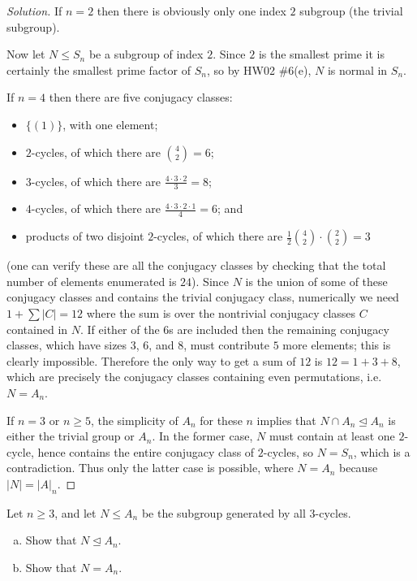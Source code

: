 \documentclass[10pt]{article}
\providecommand{\half}{\frac{1}{2}}
\providecommand{\ii}{\item}
\newenvironment{soln}{\begin{proof}[Solution]}{\end{proof}}
\providecommand{\abs}[1]{\left|#1\right|}
\begin{document}
\begin{soln}
    If $n = 2$ then there is obviously only one index $2$ subgroup
    (the trivial subgroup).

    Now let $N\le S_n$ be a subgroup of index $2$.
    Since $2$ is the smallest prime it is certainly
    the smallest prime factor of $S_n$, so by HW02 \#6(e),
    $N$ is normal in $S_n$.

    If $n = 4$ then there are five conjugacy classes:
    \begin{itemize}
	\ii $\{(1)\}$, with one element;
	\ii $2$-cycles, of which there are $\binom 42=6$;
	\ii $3$-cycles, of which there are $\frac{4\cdot3\cdot2}{3}=8$;
	\ii $4$-cycles, of which there are $\frac{4\cdot3\cdot2\cdot1}{4}=6$; and
	\ii products of two disjoint $2$-cycles, of which there are
	$\half\binom 42\cdot\binom22 = 3$
    \end{itemize}
    (one can verify these are all the conjugacy classes by checking that
    the total number of elements enumerated is $24$).
    Since $N$ is the union of some of these conjugacy classes
    and contains the trivial conjugacy class,
    numerically we need $1 + \sum\abs C = 12$ where the sum is
    over the nontrivial conjugacy classes $C$ contained in $N$.
    If either of the $6$s are included then the remaining conjugacy classes,
    which have sizes $3$, $6$, and $8$, must contribute $5$ more elements;
    this is clearly impossible. Therefore the only way to get a sum of $12$
    is $12 = 1 + 3 + 8$, which are precisely the conjugacy classes
    containing even permutations, i.e. $N = A_n$.

    If $n=3$ or $n\ge 5$, the simplicity of $A_n$ for these $n$
    implies that $N\cap A_n\trianglelefteq A_n$
    is either the trivial group or $A_n$.
    In the former case, $N$ must contain at least one $2$-cycle,
    hence contains the entire conjugacy class of $2$-cycles,
    so $N = S_n$, which is a contradiction.
    Thus only the latter case is possible,
    where $N = A_n$ because $\abs N = \abs A_n$.
\end{soln}

\pagebreak 
\begin{problem}
    Let $n\ge 3$, and let $N\le A_n$ be the subgroup generated
    by all $3$-cycles.
    \begin{enumerate}[(a)]
        \ii Show that $N\trianglelefteq A_n$.
	\ii Show that $N = A_n$.
    \end{enumerate}
\end{problem}
\end{document}
